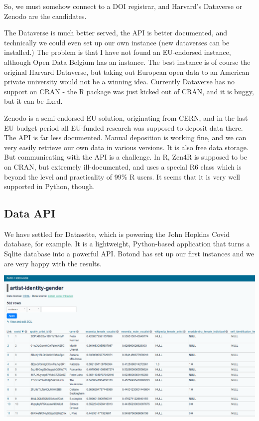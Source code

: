 \documentclass[
  a4paper,
  openany, a4paper, oneside]{book}
\begin{document}
So, we must somehow connect to a DOI registrar, and Harvard's Dataverse or Zenodo are the candidates.

The Dataverse is much better served, the API is better documented, and technically we could even set up our own instance (new dataverses can be installed.) The problem is that I have not found an EU-endorsed instance, although Open Data Belgium has an instance. The best instance is of course the original Harvard Dataverse, but taking out European open data to an American private university would not be a winning idea. Currently Dataverse has no support on CRAN - the R package was just kicked out of CRAN, and it is buggy, but it can be fixed.

Zenodo is a semi-endorsed EU solution, originating from CERN, and in the last EU budget period all EU-funded research was supposed to deposit data there. The API is far less documented. Manual deposition is working fine, and we can very easily retrieve our own data in various versions. It is also free data storage. But communicating with the API is a challenge. In R, Zen4R is supposed to be on CRAN, but extremely ill-documented, and uses a special R6 class which is beyond the level and practicality of 99\% R users. It seems that it is very well supported in Python, though.

\hypertarget{data-api}{%
\subsection{Data API}\label{data-api}}

We have settled for Datasette, which is powering the John Hopkins Covid database, for example. It is a lightweight, Python-based application that turns a Sqlite database into a powerful API. Botond has set up our first instances and we are very happy with the results.

\begin{center}\includegraphics[width=0.8\linewidth]{plots/data-api-artist-gender-table} \end{center}
\end{document}
